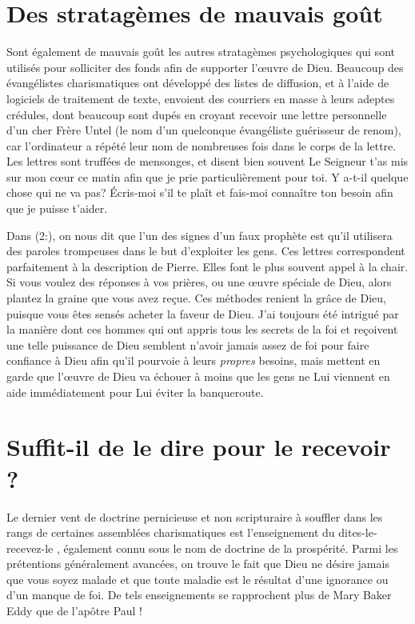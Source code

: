 \section{Des stratag\`emes de mauvais go\^ut}

Sont également de mauvais goût les autres stratagèmes psychologiques
 qui sont utilisés pour solliciter des fonds afin de supporter l'œuvre
 de Dieu. Beaucoup des évangélistes charismatiques ont développé
 des listes de diffusion, et à l'aide de logiciels de traitement
 de texte, envoient des courriers en masse à leurs adeptes crédules,
 dont beaucoup sont dupés en croyant recevoir une lettre personnelle
 d'un cher Frère Untel (le nom d'un quelconque évangéliste guérisseur
 de renom), car l'ordinateur a répété leur nom de nombreuses fois
 dans le corps de la lettre. Les lettres sont truffées de mensonges,
 et disent bien souvent\frcolon{} \Og Le Seigneur t'as mis sur mon cœur
 ce matin afin que je prie particulièrement pour toi.
 Y a-t-il quelque chose qui ne va pas? Écris-moi s'il te plaît
 et fais-moi connaître ton besoin afin que je puisse t'aider. \Fg{}

Dans (2:), on nous dit que l'un des signes
 d'un faux prophète est qu'il utilisera des paroles trompeuses
 dans le but d'ex\-ploi\-ter les gens. Ces lettres correspondent parfaitement
 à la description de Pierre. Elles font le plus souvent appel à la chair.
 Si vous voulez des réponses à vos prières, ou une œuvre spéciale de Dieu,
 alors plantez la graine que vous avez reçue.
 Ces méthodes renient la grâce de Dieu, puisque vous êtes sensés acheter
 la faveur de Dieu. J'ai toujours été intrigué par la manière dont
 ces hommes qui ont appris tous les secrets de la foi
 et reçoivent une telle puissance de Dieu semblent n'avoir jamais assez
 de foi pour faire confiance à Dieu afin qu'il pourvoie
 à leurs \emph{propres} besoins, mais mettent en garde que l'œuvre de Dieu
 va échouer à moins que les gens ne Lui viennent en aide
 immédiatement pour Lui éviter la banqueroute.


\section{Suffit-il de le dire pour le recevoir ?}

Le dernier vent de doctrine pernicieuse et non scripturaire à \linebreak
 souffler dans les rangs de certaines assemblées charismatiques
 est l'en\-sei\-gne\-ment du \Og dites-le-recevez-le \Fg{},
 également connu sous le nom de doctrine de la prospérité.
 Parmi les prétentions généralement avancées, on trouve le fait
 que Dieu ne désire jamais que vous soyez malade et que toute maladie
 est le résultat d'une ignorance ou d'un manque de foi.
 De tels enseignements se rapprochent plus de Mary Baker Eddy
 que de l'apôtre Paul !

